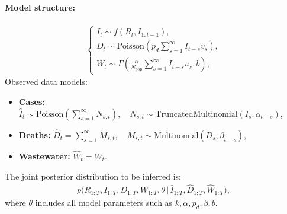 \documentclass{article}
\begin{document}
\paragraph{Model structure:}

\begin{align}
\begin{cases}
I_t \sim f(R_t, I_{1:t-1}), \\[6pt]
D_t \sim \mathrm{Poisson}\left(p_d \sum_{s=1}^\infty I_{t-s} v_s \right), \\[6pt]
W_t \sim \Gamma\left(\frac{\alpha}{N_{\mathrm{pop}}} \sum_{s=1}^\infty I_{t-s} u_s, b \right),
\end{cases}
\end{align}
Observed data models:
\begin{itemize}
    \item \textbf{Cases:} $\widehat{I}_t \sim \mathrm{Poisson}\left(\sum_{s=1}^\infty N_{s,t}\right), \quad N_{s,t} \sim \mathrm{TruncatedMultinomial}(I_s, \alpha_{t-s})$,
    \item \textbf{Deaths:} $\widehat{D}_t = \sum_{s=1}^\infty M_{s,t}, \quad M_{s,t} \sim \mathrm{Multinomial}(D_s, \beta_{t-s})$,
    \item \textbf{Wastewater:} $\widehat{W}_t = W_t$.
\end{itemize}
The joint posterior distribution to be inferred is:
\begin{align}
p\big(R_{1:T}, I_{1:T}, D_{1:T}, W_{1:T}, \theta \,\big|\, \widehat{I}_{1:T}, \widehat{D}_{1:T}, \widehat{W}_{1:T}\big),
\end{align}
where $\theta$ includes all model parameters such as $k, \alpha, p_d, \beta, b$.
\end{document}
